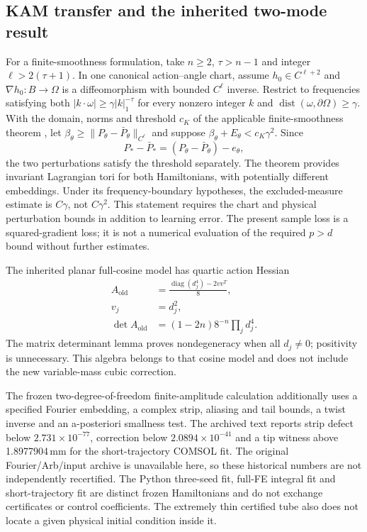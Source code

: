 \subsection{KAM transfer and the inherited two-mode result}
For a finite-smoothness formulation, take $n\ge2$, $\tau>n-1$ and integer $\ell>2(\tau+1)$. In one canonical action--angle chart, assume $h_0\in C^{\ell+2}$ and $\nabla h_0:B\to\Omega$ is a diffeomorphism with bounded $C^\ell$ inverse. Restrict to frequencies satisfying both $|k\cdot\omega|\ge\gamma|k|_1^{-\tau}$ for every nonzero integer $k$ and $\operatorname{dist}(\omega,\partial\Omega)\ge\gamma$. With the domain, norms and threshold $c_K$ of the applicable finite-smoothness theorem \citep{Bounemoura2020}, let $\beta_\theta\ge\|P_\theta-\bar P_\theta\|_{C^\ell}$ and suppose $\beta_\theta+E_\theta<c_K\gamma^2$. Since
\begin{equation}
 P_*-\bar P_*=(P_\theta-\bar P_\theta)-e_\theta,
 \label{eq:supp-learn-kam-triangle}
\end{equation}
the two perturbations satisfy the threshold separately. The theorem provides invariant Lagrangian tori for both Hamiltonians, with potentially different embeddings. Under its frequency-boundary hypotheses, the excluded-measure estimate is $C\gamma$, not $C\gamma^2$. This statement requires the chart and physical perturbation bounds in addition to learning error. The present sample loss is a squared-gradient loss; it is not a numerical evaluation of the required $p>d$ bound without further estimates.

The inherited planar full-cosine model has quartic action Hessian
\begin{equation}
 \begin{aligned}
 A_{\mathrm{old}}&=\frac{\operatorname{diag}(d_j^4)-2vv^T}{8},\\
 v_j&=d_j^2,\\
 \det A_{\mathrm{old}}&=(1-2n)8^{-n}\prod_jd_j^4.
 \end{aligned}
 \label{eq:supp-learn-old-twist}
\end{equation}
The matrix determinant lemma proves nondegeneracy when all $d_j\ne0$; positivity is unnecessary. This algebra belongs to that cosine model and does not include the new variable-mass cubic correction.

The frozen two-degree-of-freedom finite-amplitude calculation additionally uses a specified Fourier embedding, a complex strip, aliasing and tail bounds, a twist inverse and an a-posteriori smallness test. The archived text reports strip defect below $2.731\times10^{-77}$, correction below $2.0894\times10^{-41}$ and a tip witness above 1.8977904\,mm for the short-trajectory COMSOL fit. The original Fourier/Arb/input archive is unavailable here, so these historical numbers are not independently recertified. The Python three-seed fit, full-FE integral fit and short-trajectory fit are distinct frozen Hamiltonians and do not exchange certificates or control coefficients. The extremely thin certified tube also does not locate a given physical initial condition inside it.

